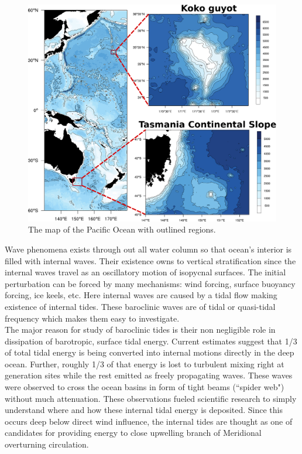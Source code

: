 \begin{figure}
\includegraphics[scale=0.5]{../figures/map_w_places.pdf}
\caption{The map of the Pacific Ocean with outlined regions.}
\end{figure}
Wave phenomena exists through out all water column so that ocean's interior is filled with internal waves. Their existence owns to vertical stratification since the internal waves  travel as an oscillatory motion of isopycnal surfaces. The initial perturbation can be forced by many mechanisms: wind forcing, surface buoyancy forcing, ice keels, etc. Here internal waves are caused by a tidal flow making existence of internal tides. These baroclinic waves are of tidal or quasi-tidal frequency which makes them easy to investigate.\\
The major reason for study of baroclinic tides is their non negligible role in dissipation of barotropic, surface tidal energy. Current estimates suggest that 1/3 of total tidal energy is being converted into internal motions directly in the deep ocean. Further, roughly 1/3 of that energy is lost to turbulent mixing right at generation sites while the rest emitted as freely propagating waves. These waves were observed to cross the ocean basins in form of tight beams (``spider web") without much attenuation. These observations fueled scientific research to simply understand where and how these internal tidal energy is deposited. Since this occurs deep below direct wind influence, the internal tides are thought as one of candidates for providing energy to close upwelling branch of Meridional overturning circulation.\\
